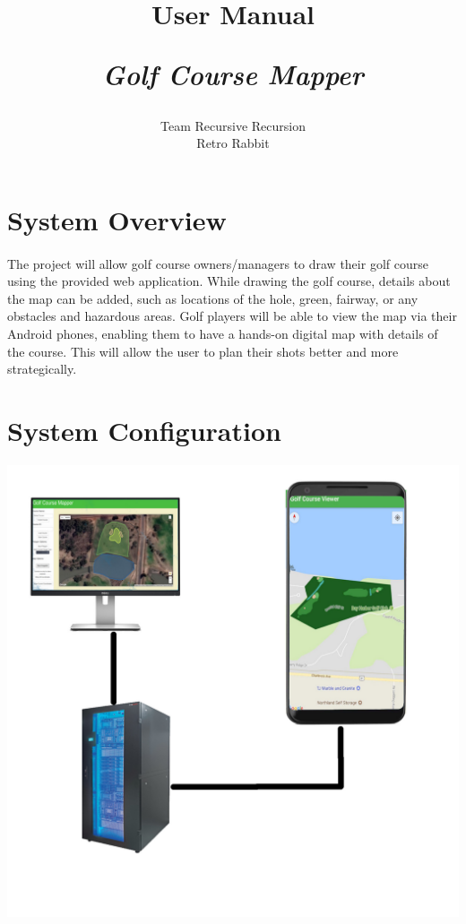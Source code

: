 \documentclass{article}
\title{
    User Manual\\
    \begin{large}
        \textit{Golf Course Mapper}
    \end{large}
}
\date{
    \begin{small}
        \today
    \end{small}
}
\author{
    Team Recursive Recursion \\
    Retro Rabbit
}
\begin{document}
    \maketitle
    \newpage


    
    
	\section{System Overview}    
	\paragraph{}
	The project will allow golf course owners/managers to draw their golf course using the provided web application. While drawing the golf course, details about the map can be added, such as locations of the hole, green, fairway, or any obstacles and hazardous areas.
Golf players will be able to view the map via their Android phones, enabling them to have a hands-on digital map with details of the course. This will allow the user to plan their shots better and more strategically.


	\section{System Configuration}
	 \includegraphics[scale=0.25]{sys-conf-diagram.jpg}
\end{document}
